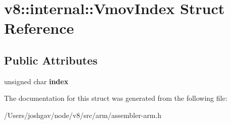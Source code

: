 \hypertarget{structv8_1_1internal_1_1_vmov_index}{}\section{v8\+:\+:internal\+:\+:Vmov\+Index Struct Reference}
\label{structv8_1_1internal_1_1_vmov_index}
\subsection*{Public Attributes}
\begin{DoxyCompactItemize}
\item 
unsigned char {\bfseries index}\hypertarget{structv8_1_1internal_1_1_vmov_index_ab3c0f56e76a583641faba44c1bc3cc1a}{}\label{structv8_1_1internal_1_1_vmov_index_ab3c0f56e76a583641faba44c1bc3cc1a}

\end{DoxyCompactItemize}


The documentation for this struct was generated from the following file\+:\begin{DoxyCompactItemize}
\item 
/\+Users/joshgav/node/v8/src/arm/assembler-\/arm.\+h\end{DoxyCompactItemize}

